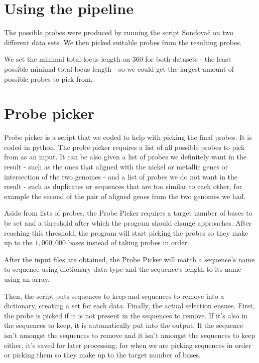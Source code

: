 \section{Using the pipeline}
The possible probes were produced by running the script Sondovač on two different data sets. We then picked suitable probes from 
the resulting probes. 

We set the minimal total locus length on $360$ for both datasets - the least possible minimal total locus length - so we could get 
the largest amount of possible probes to pick from. 



\section{Probe picker}
Probe picker is a script that we coded to help with picking the final probes. It is coded in python. The probe picker requires 
a list of all possible probes to pick from as an input. It can be also given a list of probes we definitely want in the result - such as the 
ones that aligned with the nickel or metallic genes or intersection of the two genomes - and a list of probes we do not want in 
the result - such as duplicates or sequences that are too similar to each other, for 
example the second of the pair of aligned genes from the two genomes we had. 

Aside from lists of probes, the Probe Picker requires a target number of bases to be set and a threshold after which the program should 
change approaches. After reaching this threshold, the program will start picking the probes so they make up to the $1,000,000$ bases instead of 
taking probes in order. 

After the input files are obtained, the Probe Picker will match a sequence's name to sequence using dictionary data type and the sequence's length to 
its name using an array. 

Then, the script puts sequences to keep and sequences to remove into a dictionary, creating a set for each data. 
Finally, the actual selection ensues. 
First, the probe is picked if it is not present in the sequences to remove. If it's also in the sequences to keep, it is automatically put into the output. 
If the sequence isn't amongst the sequences to remove and it isn't amongst the sequences to keep either, it's saved for later processing; for when we are 
picking sequences in order or picking them so they make up to the target number of bases. 

